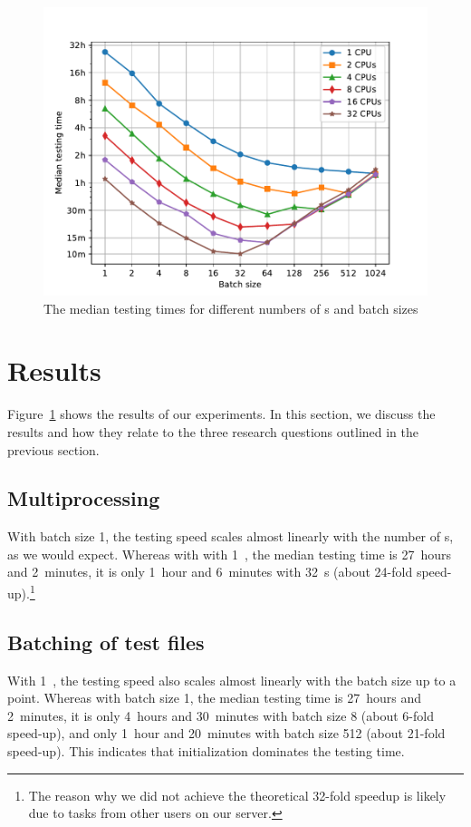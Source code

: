 \documentclass[final]{ltugboat}
\begin{document}
\begin{figure}
\includegraphics[trim={0.5cm 0.3cm 1.6cm 1.4cm}, clip, width=\linewidth]{images/speed-tests}
\caption{The median testing times for different numbers of s and batch sizes}
\label{fig:results}
\end{figure}

\section{Results}
\label{sec:results}

Figure~\ref{fig:results} shows the results of our experiments. In this section, we discuss the results and how they relate to the three research questions outlined in the previous section.

\subsection{Multiprocessing}
With batch size 1, the testing speed scales almost linearly with the number of s, as we would expect. Whereas with with 1~, the median testing time is 27~hours and 2~minutes, it is only 1~hour and 6~minutes with 32~s (about 24-fold speed-up).\footnote{%
The reason why we did not achieve the theoretical 32-fold speedup is likely due to tasks from other users on our server.%
}

\subsection{Batching of test files}
With 1~, the testing speed also scales almost linearly with the batch size up to a point. Whereas with batch size 1, the median testing time is 27~hours and 2~minutes, it is only 4~hours and 30~minutes with batch size 8 (about 6-fold speed-up), and only 1~hour and 20~minutes with batch size 512 (about 21-fold speed-up). This indicates that initialization dominates the testing time.
\end{document}
